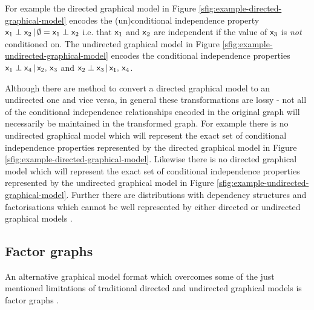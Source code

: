 For example the directed graphical model in Figure \ref{sfig:example-directed-graphical-model} encodes the (un)conditional independence property $\mathsf{x}_1 \perp \mathsf{x}_2 \operatorname{|} \emptyset = \mathsf{x}_1 \perp \mathsf{x}_2$ i.e. that $\mathsf{x}_1$ and $\mathsf{x}_2$ are independent if the value of $\mathsf{x}_3$ is \emph{not} conditioned on. The undirected graphical model in Figure \ref{sfig:example-undirected-graphical-model} encodes the conditional independence properties $\mathsf{x}_1 \perp \mathsf{x}_4 \operatorname{|} \mathsf{x_2},\,\mathsf{x}_3$ and $\mathsf{x}_2 \perp \mathsf{x}_3 \operatorname{|} \mathsf{x_1},\,\mathsf{x}_4$.

Although there are method to convert a directed graphical model to an undirected one and vice versa, in general these transformations are lossy - not all of the conditional independence relationships encoded in the original graph will necessarily be maintained in the transformed graph. For example there is no undirected graphical model which will represent the exact set of conditional independence properties represented by the directed graphical model in Figure \ref{sfig:example-directed-graphical-model}. Likewise there is no directed graphical model which will represent the exact set of conditional independence properties represented by the undirected graphical model in Figure \ref{sfig:example-undirected-graphical-model}. Further there are distributions with dependency structures and factorisations which cannot be well represented by either directed or undirected graphical models \citep{}.

\subsection{Factor graphs}

An alternative graphical model format which overcomes some of the just mentioned limitations of traditional directed and undirected graphical models is factor graphs \citep{}.

